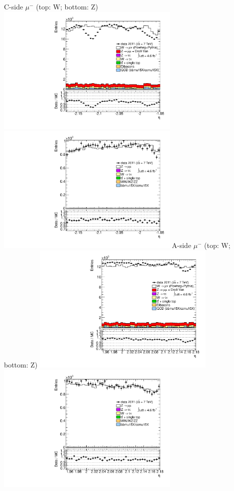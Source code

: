  {
\colb[T]
C-side $\mu^{-}$ (top: W; bottom: Z)
\centering
\includegraphics[width=0.66\textwidth]{dates/20130306/figures/etaphi/W_10_C_stack_l_eta_POS} \\
\includegraphics[width=0.66\textwidth]{dates/20130306/figures/etaphi/Z_10_C_stack_lP_eta_ALL.pdf}
A-side $\mu^{-}$ (top: W; bottom: Z)
\centering
\includegraphics[width=0.66\textwidth]{dates/20130306/figures/etaphi/W_10_A_stack_l_eta_POS} \\
\includegraphics[width=0.66\textwidth]{dates/20130306/figures/etaphi/Z_10_A_stack_lP_eta_ALL.pdf} 
\cole
}
